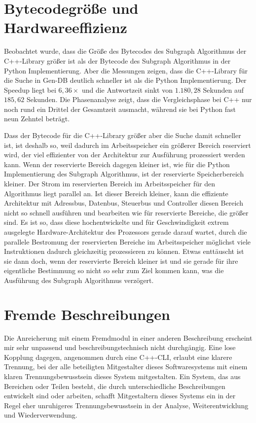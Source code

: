 \documentclass[a4paper,12pt, twoside]{report}
\theoremstyle{definition}
\begin{document}
\section{Bytecodegröße und Hardwareeffizienz}
Beobachtet wurde, dass die Größe des Bytecodes des Subgraph Algorithmus der C++-Library größer ist als der Bytecode des Subgraph Algorithmus in der Python Implementierung. Aber die Messungen zeigen, dass die C++-Library für die Suche in Gen-DB deutlich schneller ist als die Python Implementierung. Der Speedup liegt bei $6{,}36\times$ und die Antwortzeit sinkt von $1.180{,}28$ Sekunden auf $185{,}62$ Sekunden. Die Phasenanalyse zeigt, dass die Vergleichsphase bei C++ nur noch rund ein Drittel der Gesamtzeit ausmacht, während sie bei Python fast neun Zehntel beträgt.

Dass der Bytecode für die C++-Library größer aber die Suche damit schneller ist, ist deshalb so, weil dadurch im Arbeitsspeicher ein größerer Bereich reserviert wird, der viel effizienter von der Architektur zur Ausführung prozessiert werden kann. Wenn der reservierte Bereich dagegen kleiner ist, wie für die Python Implementierung des Subgraph Algorithmus, ist der reservierte Speicherbereich kleiner.
Der Strom im reservierten Bereich im Arbeitsspeicher für den Algorithmus liegt parallel an. Ist dieser Bereich kleiner, kann die effiziente Architektur mit Adressbus, Datenbus, Steuerbus und Controller diesen Bereich nicht so schnell ausführen und bearbeiten wie für reservierte Bereiche, die größer sind.
Es ist so, dass diese hochentwickelte und für Geschwindigkeit extrem ausgelegte Hardware-Architektur des Prozessors gerade darauf wartet, durch die parallele Bestromung der reservierten Bereiche im Arbeitsspeicher möglichst viele Instruktionen dadurch gleichzeitig prozessieren zu können. Etwas enttäuscht ist sie dann doch, wenn der reservierte Bereich kleiner ist und sie gerade für ihre eigentliche Bestimmung so  nicht so sehr zum Ziel kommen kann, was die Ausführung des Subgraph Algorithmus verzögert.

\section{Fremde Beschreibungen}
\label{sec:fremde_beschreibungen}
Die Anreicherung mit einem Fremdmodul in einer anderen Beschreibung erscheint mir sehr unpassend und beschreibungstechnisch nicht durchgängig. Eine lose Kopplung dagegen, angenommen durch eine C++-CLI, erlaubt eine klarere Trennung, bei der alle beteiligten Mitgestalter dieses Softwaresystems mit einem klaren Trennungsbewusstsein dieses System mitgestalten. Ein System, das aus Bereichen oder Teilen besteht, die durch unterschiedliche Beschreibungen entwickelt sind oder arbeiten, schafft Mitgestaltern dieses Systems ein in der Regel eher unruhigeres Trennungsbewusstsein in der Analyse, Weiterentwicklung und Wiederverwendung.
\end{document}
